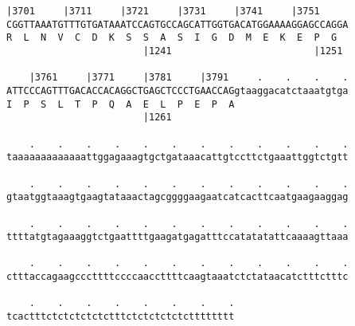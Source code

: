 \documentclass{article}
\begin{document}
\newpage
\begin{Verbatim}[fontfamily=courier]
    |3701     |3711     |3721     |3731     |3741     |3751 
CGGTTAAATGTTTGTGATAAATCCAGTGCCAGCATTGGTGACATGGAAAAGGAGCCAGGA
R  L  N  V  C  D  K  S  S  A  S  I  G  D  M  E  K  E  P  G  
                        |1241                         |1251 

    |3761     |3771     |3781     |3791     .    .    .    .
ATTCCCAGTTTGACACCACAGGCTGAGCTCCCTGAACCAGgtaaggacatctaaatgtga
I  P  S  L  T  P  Q  A  E  L  P  E  P  A                    
                        |1261                               

    .    .    .    .    .    .    .    .    .    .    .    .
taaaaaaaaaaaaattggagaaagtgctgataaacattgtccttctgaaattggtctgtt

    .    .    .    .    .    .    .    .    .    .    .    .
gtaatggtaaagtgaagtataaactagcggggaagaatcatcacttcaatgaagaaggag

    .    .    .    .    .    .    .    .    .    .    .    .
ttttatgtagaaaggtctgaattttgaagatgagatttccatatatattcaaaagttaaa

    .    .    .    .    .    .    .    .    .    .    .    .
ctttaccagaagcccttttccccaaccttttcaagtaaatctctataacatctttctttc

    .    .    .    .    .    .    .    .
tcactttctctctctctctttctctctctctctttttttt
\end{Verbatim}
\newpage
\end{document}
